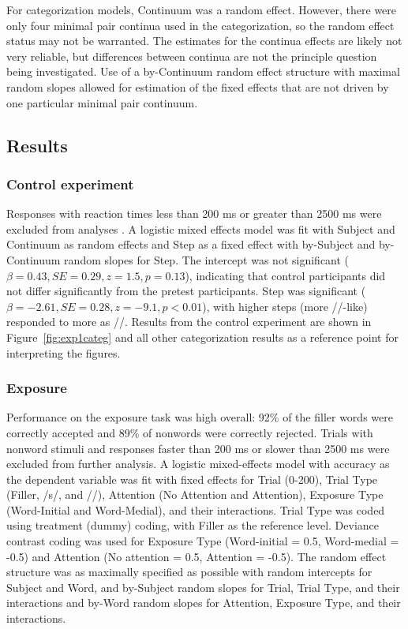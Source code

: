 For categorization models, Continuum was a random effect.
However, there were only four minimal pair continua used in the categorization, so the random effect status may not be warranted.
The estimates for the continua effects are likely not very reliable, but differences between continua are not the principle question being investigated.
Use of a by-Continuum random effect structure with maximal random slopes allowed for estimation of the fixed effects that are not driven by one particular minimal pair continuum.

\subsection{Results}

\subsubsection{Control experiment}

Responses with reaction times less than 200 ms or greater than 2500 ms were excluded from analyses \citep[following][]{Reinisch2013}. 
A logistic mixed effects model was fit with Subject and Continuum as random effects and Step as a fixed effect with by-Subject and by-Continuum random slopes for Step. 
The intercept was not significant ($\beta = 0.43, SE = 0.29, z = 1.5, p = 0.13$), indicating that control participants did not differ significantly from the pretest participants.
Step was significant ($\beta = -2.61, SE = 0.28, z = -9.1, p < 0.01$), with higher steps (more /\textesh/-like) responded to more as /\textesh/.
Results from the control experiment are shown in Figure~\ref{fig:exp1categ} and all other categorization results as a reference point for interpreting the figures.

\subsubsection{Exposure}

Performance on the exposure task was high overall: 92\% of the filler words were correctly accepted and 89\% of nonwords were correctly rejected.  
Trials with nonword stimuli and responses faster than 200 ms or slower than 2500 ms were excluded from further analysis. 
A logistic mixed-effects model with accuracy as the dependent variable was fit with fixed effects for Trial (0-200), Trial Type (Filler, /s/, and /\textesh/), Attention (No Attention and Attention), Exposure Type (Word-Initial and Word-Medial), and their interactions.   
Trial Type was coded using treatment (dummy) coding, with Filler as the reference level.  
Deviance contrast coding was used for Exposure Type (Word-initial = 0.5, Word-medial = -0.5) and Attention (No attention = 0.5, Attention = -0.5).
The random effect structure was as maximally specified as possible with random intercepts for Subject and Word, and by-Subject random slopes for Trial, Trial Type, and their interactions and by-Word random slopes for Attention, Exposure Type, and their interactions. 

